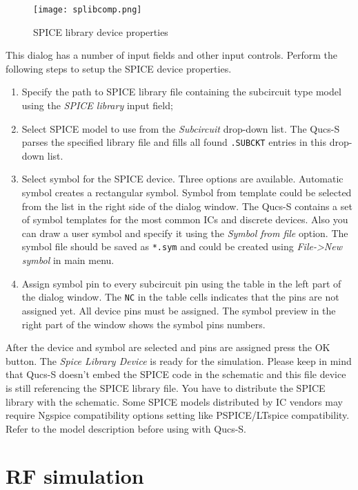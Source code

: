     \begin{figure}[!ht]
    \begin{center}
        \texttt{[image: splibcomp.png]}
    \end{center}
    \caption{SPICE library device properties} \label{fig:splibcomp}
    \end{figure}

This dialog has a number of input fields and other input controls. Perform the following steps to setup the SPICE device properties.

\begin{enumerate}
 \item Specify the path to SPICE library file containing the subcircuit type model using the \emph{SPICE library} input field;
 \item Select SPICE model to use from the \emph{Subcircuit} drop-down list. The Qucs-S parses the specified library file and fills all found \verb|.SUBCKT| entries in this drop-down list.
 \item Select symbol for the SPICE device. Three options are available. Automatic symbol creates a rectangular symbol. Symbol from template could be selected from the list in the right side of the dialog window. The Qucs-S contains a set of symbol templates for the most common ICs and discrete devices. Also you can draw a user symbol and specify it using the \emph{Symbol from file} option. The symbol file should be saved as \verb|*.sym| and could be created using \emph{File->New symbol} in main menu.
 \item Assign symbol pin to every subcircuit pin using the table in the left part of the dialog window. The \verb|NC| in the table cells indicates that the pins are not assigned yet. All device pins must be assigned. The symbol preview in the right part of the window shows the symbol pins numbers.
\end{enumerate}

After the device and symbol are selected and pins are assigned press the OK button. The \emph{Spice Library Device} is ready for the simulation. Please keep in mind that Qucs-S doesn't embed the SPICE code in the schematic and this file device is still referencing the SPICE library file. You have to distribute the SPICE library with the schematic. Some SPICE models distributed by IC vendors may require Ngspice compatibility options setting like PSPICE/LTspice compatibility. Refer to the model description before using with Qucs-S.

\section{RF simulation}

